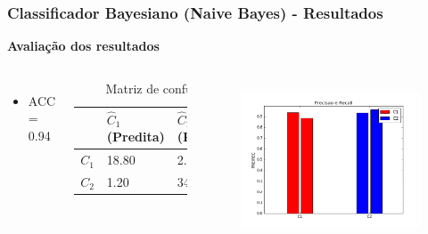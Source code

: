 \documentclass{beamer}
\begin{document}
\begin{frame}
\frametitle{Classificador Bayesiano (Naive Bayes) - Resultados}

\textbf{Avaliação dos resultados}
\begin{columns}[c] 
\begin{itemize}
\item ACC = 0.94
\end{itemize}

\begin{table}
\begin{tabular}{l l l}
\toprule
 & \textbf{$\hat{C}_1$ (Predita)} & \textbf{$\hat{C}_2$(Predita)}\\
\midrule
$C_1$ & 18.80&2.40\\ 
$C_2$ &  1.20&34.50\\ 
\bottomrule
\end{tabular}
\caption{Matriz de confusão}
\end{table}


\begin{figure}[H]
\centering
  \includegraphics[width=\linewidth]{../img/naive_bayes_rec.png}
  \label{fig:percep}
\end{figure}%

\end{columns}

\end{frame}
\end{document}

